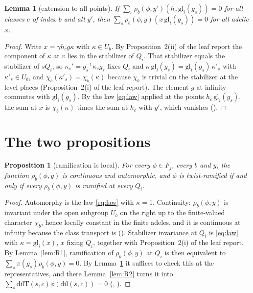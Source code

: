 \documentclass[11pt]{article}
\newcommand{\rT}{\rho}
\newtheorem{proposition}[theorem]{Proposition}
\newtheorem{lemma}[theorem]{Lemma}
\theoremstyle{definition}
\theoremstyle{remark}
\begin{document}
\begin{lemma}[extension to all points]\label{lem:R3}
If $\sum_s\rT_b(\phi,y')(h_c\,\mathrm{gl}_i(g_s))=0$ for all classes $c$ of index $b$ and all $y'$, then $\sum_s\rT_b(\phi,y)(x\,\mathrm{gl}_i(g_s))=0$ for all adelic $x$.
\end{lemma}

\begin{proof}
Write $x=\gamma h_cg\kappa$ with $\kappa\in U_b$. By Proposition~2(ii) of the leaf report the component of $\kappa$ at $v$ lies in the stabilizer of $Q_i$. That stabilizer equals the stabilizer of $sQ_i$, so $\kappa_s'=g_s^{-1}\kappa_vg_s$ fixes $Q_i$ and $\kappa\,\mathrm{gl}_i(g_s)=\mathrm{gl}_i(g_s)\,\kappa'_s$ with $\kappa'_s\in U_b$, and $\chi_b(\kappa'_s)=\chi_b(\kappa)$ because $\chi_b$ is trivial on the stabilizer at the level places (Proposition~2(i) of the leaf report). The element $g$ at infinity commutes with $\mathrm{gl}_i(g_s)$. By the law \eqref{eq:law} applied at the points $h_c\,\mathrm{gl}_i(g_s)$, the sum at $x$ is $\chi_b(\kappa)$ times the sum at $h_c$ with $y'$, which vanishes ().
\end{proof}

\section{The two propositions}

\begin{proposition}[ramification is local]\label{prop:ram}
For every $\phi\in F_j$, every $b$ and $y$, the function $\rT_b(\phi,y)$ is continuous and automorphic, and $\phi$ is twist-ramified if and only if every $\rT_b(\phi,y)$ is ramified at every $Q_i$.
\end{proposition}

\begin{proof}
Automorphy is the law \eqref{eq:law} with $\kappa=1$. Continuity: $\rT_b(\phi,y)$ is invariant under the open subgroup $U_b$ on the right up to the finite-valued character $\chi_b$, hence locally constant in the finite adeles, and it is continuous at infinity because the class transport is (). Stabilizer invariance at $Q_i$ is \eqref{eq:law} with $\kappa=\mathrm{gl}_i(x)$, $x$ fixing $Q_i$, together with Proposition~2(i) of the leaf report. By Lemma~\ref{lem:R1}, ramification of $\rT_b(\phi,y)$ at $Q_i$ is then equivalent to $\sum_s\pi(g_s)\rT_b(\phi,y)=0$. By Lemma~\ref{lem:R3} it suffices to check this at the representatives, and there Lemma~\ref{lem:R2} turns it into $\sum_s\mathrm{dilT}(s,c)\phi(\mathrm{dil}(s,c))=0$ (, ).
\end{proof}
\end{document}
